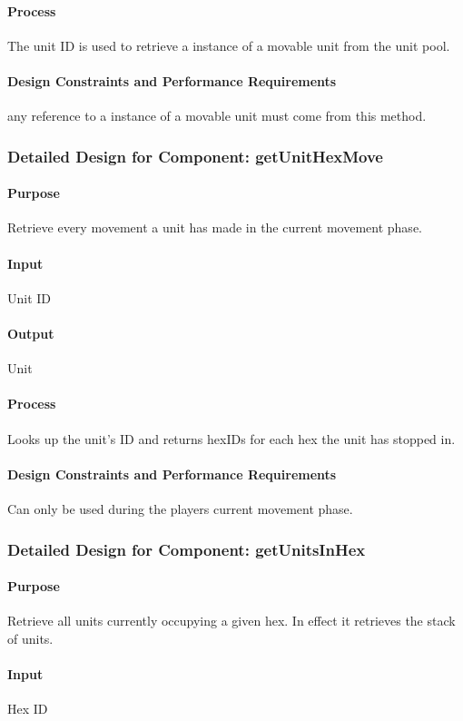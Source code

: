 \documentclass[12pt,a4paper,titlepage]{article}
\begin{document}
\paragraph{Process} The unit ID is used to retrieve a instance of a movable unit from the unit pool.
\paragraph{Design Constraints and Performance Requirements} any reference to a instance of a movable unit must come from this method.

\subsubsection{Detailed Design for Component: getUnitHexMove}
\paragraph{Purpose} Retrieve every movement a unit has made in the current movement phase.
\paragraph{Input} Unit ID
\paragraph{Output} Unit
\paragraph{Process} Looks up the unit's ID and returns hexIDs for each hex the unit has stopped in.
\paragraph{Design Constraints and Performance Requirements} Can only be used during the players current movement phase.

\subsubsection{Detailed Design for Component: getUnitsInHex}
\paragraph{Purpose} Retrieve all units currently occupying a given hex.  In effect it retrieves the stack of units.
\paragraph{Input} Hex ID
\end{document}
